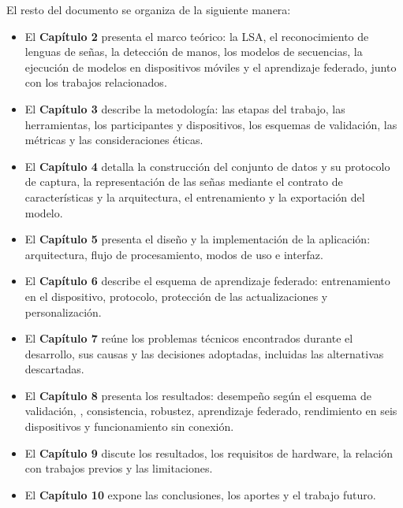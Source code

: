 El resto del documento se organiza de la siguiente manera:

\begin{itemize}
    \item El \textbf{Capítulo 2} presenta el marco teórico: la LSA, el reconocimiento de lenguas de señas, la detección de manos, los modelos de secuencias, la ejecución de modelos en dispositivos móviles y el aprendizaje federado, junto con los trabajos relacionados.
    \item El \textbf{Capítulo 3} describe la metodología: las etapas del trabajo, las herramientas, los participantes y dispositivos, los esquemas de validación, las métricas y las consideraciones éticas.
    \item El \textbf{Capítulo 4} detalla la construcción del conjunto de datos y su protocolo de captura, la representación de las señas mediante el contrato de características y la arquitectura, el entrenamiento y la exportación del modelo.
    \item El \textbf{Capítulo 5} presenta el diseño y la implementación de la aplicación: arquitectura, flujo de procesamiento, modos de uso e interfaz.
    \item El \textbf{Capítulo 6} describe el esquema de aprendizaje federado: entrenamiento en el dispositivo, protocolo, protección de las actualizaciones y personalización.
    \item El \textbf{Capítulo 7} reúne los problemas técnicos encontrados durante el desarrollo, sus causas y las decisiones adoptadas, incluidas las alternativas descartadas.
    \item El \textbf{Capítulo 8} presenta los resultados: desempeño según el esquema de validación, , consistencia, robustez, aprendizaje federado, rendimiento en seis dispositivos y funcionamiento sin conexión.
    \item El \textbf{Capítulo 9} discute los resultados, los requisitos de hardware, la relación con trabajos previos y las limitaciones.
    \item El \textbf{Capítulo 10} expone las conclusiones, los aportes y el trabajo futuro.
\end{itemize}
